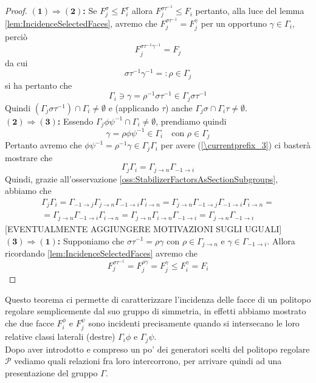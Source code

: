 \documentclass[a4paper,12pt]{report}
\newcommand{\p}{\mathcal{P}}
\theoremstyle{plain}
\theoremstyle{definition}
\newcommand\localref[1]{\ref{\currentprefix_#1}}
\newcommand\implication[2]{$\bm{(#1)\Rightarrow(#2)}$\textbf{: }}
\begin{document}
\begin{proof}
\implication{1}{2}Se $F_j^\sigma\leq F_i^\tau$ allora $F_j^{\sigma\tau^{-1}}\leq F_i$ pertanto, alla luce del lemma \ref{lem:IncidenceSelectedFaces},
avremo che $F_j^{\sigma\tau^{-1}}=F_j^\gamma$ per un opportuno $\gamma\in\Gamma_i$, perci\`o
\begin{equation*}
F_j^{\sigma\tau^{-1}\gamma^{-1}}=F_j
\end{equation*}
da cui
\begin{equation*}
\sigma\tau^{-1}\gamma^{-1}=:\rho\in\Gamma_j
\end{equation*}
si ha pertanto che
\begin{equation*}
\Gamma_i\ni\gamma=\rho^{-1}\sigma\tau^{-1}\in\Gamma_j\sigma\tau^{-1}
\end{equation*}
Quindi $(\Gamma_j\sigma\tau^{-1})\cap\Gamma_i\neq\emptyset$ e (applicando $\tau$) anche $\Gamma_j\sigma\cap\Gamma_i\tau\neq\emptyset$.\\
\implication{2}{3}Essendo $\Gamma_j\phi\psi^{-1}\cap\Gamma_i\neq\emptyset$, prendiamo quindi
\begin{equation*}
\gamma=\rho\phi\psi^{-1}\in\Gamma_i\quad\text{con }\rho\in\Gamma_j
\end{equation*}
Pertanto avremo che $\phi\psi^{-1}=\rho^{-1}\gamma\in\Gamma_j\Gamma_i$ per avere (\localref{3}) ci baster\`a mostrare che
\begin{equation*}
\Gamma_j\Gamma_i=\Gamma_{j\rightarrow n}\Gamma_{-1\rightarrow i}
\end{equation*}
Quindi, grazie all'osservazione \ref{oss:StabilizerFactorsAsSectionSubgroups}, abbiamo che
\begin{gather*}
\Gamma_j\Gamma_i=\Gamma_{-1\rightarrow j}\Gamma_{j\rightarrow n}\Gamma_{-1\rightarrow i}\Gamma_{i\rightarrow n}=
\Gamma_{j\rightarrow n}\Gamma_{-1\rightarrow j}\Gamma_{-1\rightarrow i}\Gamma_{i\rightarrow n}=\\
=\Gamma_{j\rightarrow n}\Gamma_{-1\rightarrow i}\Gamma_{i\rightarrow n}=\Gamma_{j\rightarrow n}\Gamma_{i\rightarrow n}\Gamma_{-1\rightarrow i}=
\Gamma_{j\rightarrow n}\Gamma_{-1\rightarrow i}
\end{gather*}
[EVENTUALMENTE AGGIUNGERE MOTIVAZIONI SUGLI UGUALI]
\implication{3}{1}Supponiamo che $\sigma\tau^{-1}=\rho\gamma$ con $\rho\in\Gamma_{j\rightarrow n}$ e $\gamma\in\Gamma_{-1\rightarrow i}$. Allora
ricordando \ref{lem:IncidenceSelectedFaces} avremo che
\begin{equation*}
F_j^{\sigma\tau^{-1}}=F_j^{\rho\gamma}=F_j^\gamma\leq F_i^\gamma=F_i
\end{equation*}
\end{proof}
Questo teorema ci permette di caratterizzare l'incidenza delle facce di un politopo regolare semplicemente dal suo gruppo di simmetria, in effetti
abbiamo mostrato che due facce $F_i^\phi$ e $F_j^\psi$ sono incidenti precisamente quando si intersecano le loro relative classi laterali (destre)
$\Gamma_i\phi$ e $\Gamma_j\psi$.\\
Dopo aver introdotto e compreso un po' dei generatori scelti del politopo regolare $\p$ vediamo quali relazioni fra loro intercorrono, per arrivare
quindi ad una presentazione del gruppo $\Gamma$.
\end{document}
